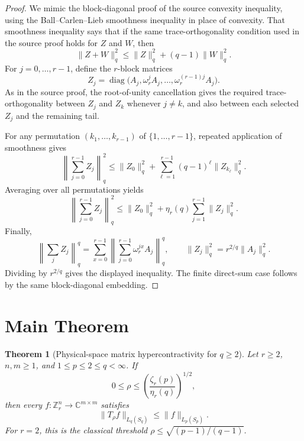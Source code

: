 \documentclass[11pt]{article}
\newtheorem{theorem}{Theorem}
\newcommand{\C}{\mathbb C}
\newcommand{\Z}{\mathbb Z}
\begin{document}
\begin{proof}
We mimic the block-diagonal proof of the source convexity inequality, using
the Ball--Carlen--Lieb smoothness inequality in place of convexity. That
smoothness inequality says that if the same trace-orthogonality condition used
in the source proof holds for $Z$ and $W$, then
\[
  \|Z+W\|_q^2\leq \|Z\|_q^2+(q-1)\|W\|_q^2 .
\]
For $j=0,\ldots,r-1$, define the $r$-block matrices
\[
  Z_j=\operatorname{diag}\bigl(A_j,\omega_r^jA_j,\ldots,
  \omega_r^{(r-1)j}A_j\bigr).
\]
As in the source proof, the root-of-unity cancellation gives the required
trace-orthogonality between $Z_j$ and $Z_k$ whenever $j\neq k$, and also
between each selected $Z_j$ and the remaining tail.

For any permutation $(k_1,\ldots,k_{r-1})$ of $\{1,\ldots,r-1\}$, repeated
application of smoothness gives
\[
  \left\|\sum_{j=0}^{r-1}Z_j\right\|_q^2
  \leq
  \|Z_0\|_q^2+\sum_{\ell=1}^{r-1}(q-1)^\ell\|Z_{k_\ell}\|_q^2 .
\]
Averaging over all permutations yields
\[
  \left\|\sum_{j=0}^{r-1}Z_j\right\|_q^2
  \leq
  \|Z_0\|_q^2+\eta_r(q)\sum_{j=1}^{r-1}\|Z_j\|_q^2 .
\]
Finally,
\[
  \left\|\sum_j Z_j\right\|_q^q
  =
  \sum_{x=0}^{r-1}
  \left\|\sum_{j=0}^{r-1}\omega_r^{jx}A_j\right\|_q^q,
  \qquad
  \|Z_j\|_q^2=r^{2/q}\|A_j\|_q^2.
\]
Dividing by $r^{2/q}$ gives the displayed inequality. The finite direct-sum
case follows by the same block-diagonal embedding.
\end{proof}

\section*{Main Theorem}

\begin{theorem}[Physical-space matrix hypercontractivity for $q\geq2$]
\label{thm:main}
Let $r\geq2$, $n,m\geq1$, and $1\leq p\leq2\leq q<\infty$. If
\[
  0\leq \rho\leq \left(\frac{\zeta_r(p)}{\eta_r(q)}\right)^{1/2},
\]
then every $f:\Z_r^n\to\C^{m\times m}$ satisfies
\[
  \|T_\rho f\|_{L_q(S_q)}\leq \|f\|_{L_p(S_p)} .
\]
For $r=2$, this is the classical threshold
$\rho\leq\sqrt{(p-1)/(q-1)}$.
\end{theorem}
\end{document}
